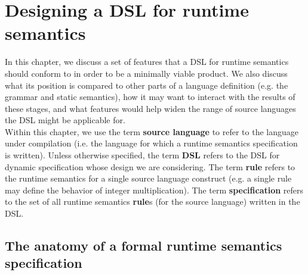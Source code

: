 
\chapter{\label{ch:design}Designing a \acs{DSL} for runtime semantics}


In this chapter, we discuss a set of features that a \ac{DSL} for runtime semantics should conform to in order to be a minimally viable product. We also discuss what its position is compared to other parts of a language definition (e.g. the grammar and static semantics), how it may want to interact with the results of these stages, and what features would help widen the range of source languages the \ac{DSL} might be applicable for.\\

Within this chapter, we use the term \textbf{source language} to refer to the language under compilation (i.e. the language for which a runtime semantics specification is written). Unless otherwise specified, the term \textbf{\ac{DSL}} refers to the \ac{DSL} for dynamic specification whose design we are considering. The term \textbf{rule} refers to the runtime semantics for a single source language construct (e.g. a single rule may define the behavior of integer multiplication). The term \textbf{specification} refers to the set of all runtime semantics \textbf{rule}s (for the source language) written in the \ac{DSL}.

\section{}

\section{The anatomy of a formal runtime semantics specification}
\label{sec:design_anatomy}

